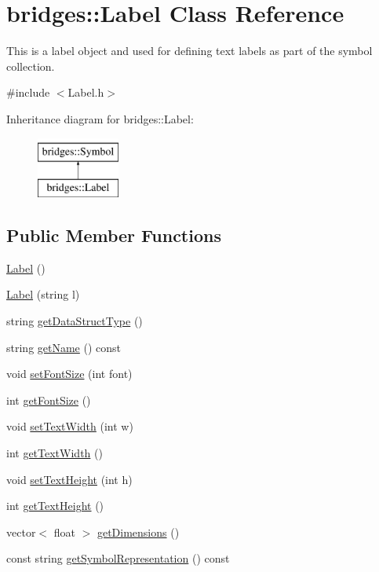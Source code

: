 \hypertarget{classbridges_1_1_label}{}\section{bridges\+:\+:Label Class Reference}
\label{classbridges_1_1_label}


This is a label object and used for defining text labels as part of the symbol collection.  




{\ttfamily \#include $<$Label.\+h$>$}

Inheritance diagram for bridges\+:\+:Label\+:\begin{figure}[H]
\begin{center}
\leavevmode
\includegraphics[height=2.000000cm]{classbridges_1_1_label}
\end{center}
\end{figure}
\subsection*{Public Member Functions}
\begin{DoxyCompactItemize}
\item 
\mbox{\hyperlink{classbridges_1_1_label_a6ecba5526127d5ed4d37bb38da560cc8}{Label}} ()
\item 
\mbox{\hyperlink{classbridges_1_1_label_a339ddf0650b3e2aa7383ab58cb61e8fa}{Label}} (string l)
\item 
string \mbox{\hyperlink{classbridges_1_1_label_a737053b6e94767959572f9985ea375c8}{get\+Data\+Struct\+Type}} ()
\item 
string \mbox{\hyperlink{classbridges_1_1_label_a3a55f3d7e0794401bfb1c43ea85e7c86}{get\+Name}} () const
\item 
void \mbox{\hyperlink{classbridges_1_1_label_aee9777172a46b4b2e099a4d1e317b6c1}{set\+Font\+Size}} (int font)
\item 
int \mbox{\hyperlink{classbridges_1_1_label_a630528ede3c5cc77548aeec886b92c1c}{get\+Font\+Size}} ()
\item 
void \mbox{\hyperlink{classbridges_1_1_label_ae7fc3629c3e1d18ceec6d96a9fa1f3a6}{set\+Text\+Width}} (int w)
\item 
int \mbox{\hyperlink{classbridges_1_1_label_ae5259108e1d7c9aa63475a356e9759b7}{get\+Text\+Width}} ()
\item 
void \mbox{\hyperlink{classbridges_1_1_label_a0f12dc8d5530ae4c66e2be4974284d2b}{set\+Text\+Height}} (int h)
\item 
int \mbox{\hyperlink{classbridges_1_1_label_a65746c9728f3b4e0c4b5c4d9ab0d4ee1}{get\+Text\+Height}} ()
\item 
vector$<$ float $>$ \mbox{\hyperlink{classbridges_1_1_label_a97d5638f629edbd6733b8f8572ca42ba}{get\+Dimensions}} ()
\item 
const string \mbox{\hyperlink{classbridges_1_1_label_af4bdf9e492cf2a2bf3a8be42bd282b44}{get\+Symbol\+Representation}} () const
\end{DoxyCompactItemize}
